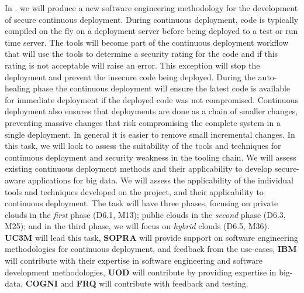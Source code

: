 \begin{Workpackage}{\thewpno}
\begin{Task}



\TaskResults{%
}
\TaskHeader{}

In \theTask. we will produce a new software engineering methodology for the development of secure continuous deployment.  During continuous deployment, code is typically compiled on the fly on a deployment server before being deployed to a test or run time server.  The \TheProject{} tools will become part of the continuous deployment workflow that will use the tools to determine a security rating for the code and if this rating is not acceptable will raise an error. This exception will stop the deployment and prevent the insecure code being deployed. During the auto-healing phase the continuous deployment will ensure the latest code is available for immediate deployment if the deployed code was not compromised. Continuous deployment also ensures that deployments are done as a chain of smaller changes, preventing massive changes that risk compromising the complete system in a single deployment. In general it is easier to remove small incremental changes. In this task, we will look to assess the suitability of the tools and techniques for continuous deployment and security weakness in the tooling chain.  We will assess existing continuous deployment methods and their applicability to develop secure-aware applications for big data. We will assess the applicability of the individual tools and techniques developed on the \TheProject{} project, and their applicability to continuous deployment. The task will have three phases, focusing on private clouds in the \emph{first} phase (D6.1, M13); public clouds in the \emph{second} phase (D6.3, M25); and in the third phase, we will focus on \emph{hybrid} clouds (D6.5, M36). \textbf{UC3M} will lead this task, \textbf{SOPRA} will provide support on software engineering methodologies for continuous deployment, and feedback from the use-cases, \textbf{IBM} will contribute with their expertise in software engineering and software development methodologies, \textbf{UOD} will contribute by providing expertise in big-data, \textbf{COGNI} and \textbf{FRQ} will contribute with feedback and testing.
\end{Task}


\end{Workpackage}
